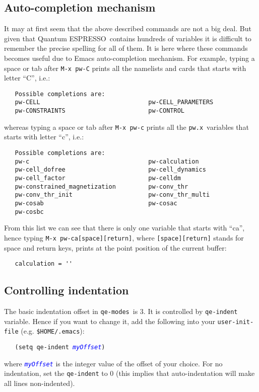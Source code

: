 \documentclass[12pt,a4paper]{article}
\def\qe{{\sc Quantum ESPRESSO}}
\def\pwx{\texttt{pw.x}}
\def\qemodes{\texttt{qe-modes}}
\def\var#1{\textcolor{Blue}{\texttt{\textit{#1}}}}
\begin{document}
\subsection{Auto-completion mechanism}
It may at first seem that the above described commands are not a big
deal. But given that \qe\ contains hundreds of variables it is
difficult to remember the precise spelling for all of them. It is here
where these commands becomes useful due to Emacs auto-completion
mechanism. For example, typing a space or tab after \texttt{M-x pw-C} 
prints all the namelists and cards that starts with letter ``C'', i.e.:
\begin{verbatim}
   Possible completions are:
   pw-CELL                              pw-CELL_PARAMETERS
   pw-CONSTRAINTS                       pw-CONTROL
\end{verbatim}
\noindent whereas typing a space or tab after \texttt{M-x pw-c}
prints all the \pwx\ variables that starts with letter ``c'', i.e.:
\begin{verbatim}
   Possible completions are:
   pw-c                                 pw-calculation
   pw-cell_dofree                       pw-cell_dynamics
   pw-cell_factor                       pw-celldm
   pw-constrained_magnetization         pw-conv_thr
   pw-conv_thr_init                     pw-conv_thr_multi
   pw-cosab                             pw-cosac
   pw-cosbc
\end{verbatim}
\noindent
From this list we can see that there is only one variable that starts
with ``ca'', hence typing \texttt{M-x pw-ca[space][return]}, where
\texttt{[space][return]} stands for space and return keys, prints at
the point position of the current buffer:
\begin{verbatim}
   calculation = ''
\end{verbatim}

\subsection{Controlling indentation}

The basic indentation offset in \qemodes\ is 3. It is controlled by
\texttt{qe-indent} variable. Hence if you want to change it, add the
following into your \texttt{user-init-file}
(e.g. \texttt{\$HOME/.emacs}):
\begin{flushleft}
\verb+   (setq qe-indent +\var{myOffset}\verb+)+
\end{flushleft}
where \var{myOffset} is the integer value of the offset of your
choice. For no indentation, set the \texttt{qe-indent} to 0 (this
implies that auto-indentation will make all lines non-indented).
\end{document}
